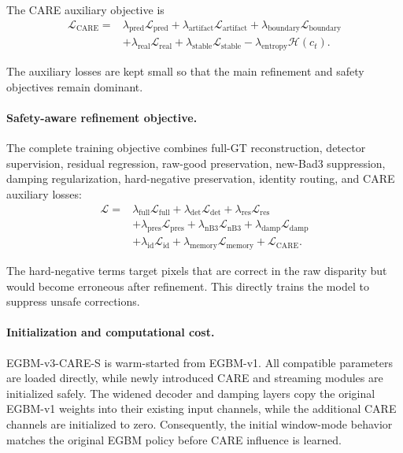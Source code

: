 \documentclass[11pt,a4paper]{article}
\begin{document}
The CARE auxiliary objective is
\begin{equation}
\begin{aligned}
    \mathcal{L}_{\mathrm{CARE}}
    =
    &\lambda_{\mathrm{pred}}
    \mathcal{L}_{\mathrm{pred}}
    +
    \lambda_{\mathrm{artifact}}
    \mathcal{L}_{\mathrm{artifact}}
    +
    \lambda_{\mathrm{boundary}}
    \mathcal{L}_{\mathrm{boundary}}
    \\
    &+
    \lambda_{\mathrm{real}}
    \mathcal{L}_{\mathrm{real}}
    +
    \lambda_{\mathrm{stable}}
    \mathcal{L}_{\mathrm{stable}}
    -
    \lambda_{\mathrm{entropy}}
    \mathcal{H}(c_t).
\end{aligned}
\end{equation}

The auxiliary losses are kept small so that the main refinement and safety
objectives remain dominant.

\paragraph{Safety-aware refinement objective.}
The complete training objective combines full-GT reconstruction, detector
supervision, residual regression, raw-good preservation, new-Bad3 suppression,
damping regularization, hard-negative preservation, identity routing, and CARE
auxiliary losses:
\begin{equation}
\begin{aligned}
    \mathcal{L}
    =
    &\lambda_{\mathrm{full}}
    \mathcal{L}_{\mathrm{full}}
    +
    \lambda_{\mathrm{det}}
    \mathcal{L}_{\mathrm{det}}
    +
    \lambda_{\mathrm{res}}
    \mathcal{L}_{\mathrm{res}}
    \\
    &+
    \lambda_{\mathrm{pres}}
    \mathcal{L}_{\mathrm{pres}}
    +
    \lambda_{\mathrm{nB3}}
    \mathcal{L}_{\mathrm{nB3}}
    +
    \lambda_{\mathrm{damp}}
    \mathcal{L}_{\mathrm{damp}}
    \\
    &+
    \lambda_{\mathrm{id}}
    \mathcal{L}_{\mathrm{id}}
    +
    \lambda_{\mathrm{memory}}
    \mathcal{L}_{\mathrm{memory}}
    +
    \mathcal{L}_{\mathrm{CARE}}.
\end{aligned}
\end{equation}

The hard-negative terms target pixels that are correct in the raw disparity but
would become erroneous after refinement. This directly trains the model to
suppress unsafe corrections.

\paragraph{Initialization and computational cost.}
EGBM-v3-CARE-S is warm-started from EGBM-v1. All compatible parameters are
loaded directly, while newly introduced CARE and streaming modules are
initialized safely. The widened decoder and damping layers copy the original
EGBM-v1 weights into their existing input channels, while the additional CARE
channels are initialized to zero. Consequently, the initial window-mode
behavior matches the original EGBM policy before CARE influence is learned.
\end{document}
